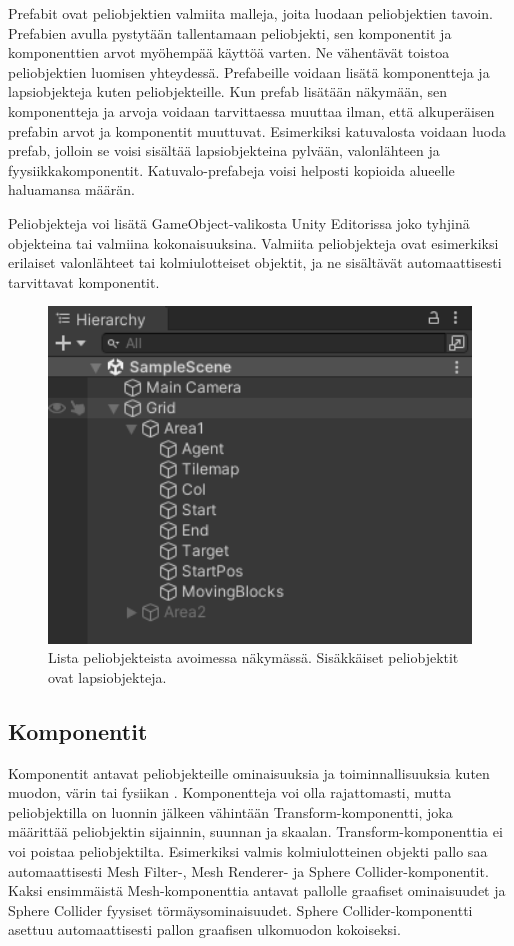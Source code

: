 \documentclass[utf8]{gradu3}
\begin{document}
Prefabit ovat peliobjektien valmiita malleja, joita luodaan peliobjektien tavoin. Prefabien avulla pystytään tallentamaan peliobjekti, sen komponentit ja komponenttien arvot myöhempää käyttöä varten. Ne vähentävät toistoa peliobjektien luomisen yhteydessä. Prefabeille voidaan lisätä komponentteja ja lapsiobjekteja kuten peliobjekteille. Kun prefab lisätään näkymään, sen komponentteja ja arvoja voidaan tarvittaessa muuttaa ilman, että alkuperäisen prefabin arvot ja komponentit muuttuvat. Esimerkiksi katuvalosta voidaan luoda prefab, jolloin se voisi sisältää lapsiobjekteina pylvään, valonlähteen ja fyysiikkakomponentit. Katuvalo-prefabeja voisi helposti kopioida alueelle haluamansa määrän.

Peliobjekteja voi lisätä GameObject-valikosta Unity Editorissa joko tyhjinä objekteina tai valmiina kokonaisuuksina. Valmiita peliobjekteja ovat esimerkiksi erilaiset valonlähteet tai kolmiulotteiset objektit, ja ne sisältävät automaattisesti tarvittavat komponentit.

\begin{figure}[h]
\centering
\includegraphics[width=12cm]{peliobjektilistaus.png}
\caption{Lista peliobjekteista avoimessa näkymässä. Sisäkkäiset peliobjektit ovat lapsiobjekteja.}
\label{peliobjektikuva}
\end{figure}

\subsection{Komponentit}

Komponentit antavat peliobjekteille ominaisuuksia ja toiminnallisuuksia kuten muodon, värin tai fysiikan \parencite{unitydoccomp}. Komponentteja voi olla rajattomasti, mutta peliobjektilla on luonnin jälkeen vähintään Transform-komponentti, joka määrittää peliobjektin sijainnin, suunnan ja skaalan. Transform-komponenttia ei voi poistaa peliobjektilta. Esimerkiksi valmis kolmiulotteinen objekti pallo saa automaattisesti Mesh Filter-, Mesh Renderer- ja Sphere Collider-komponentit. Kaksi ensimmäistä Mesh-komponenttia antavat pallolle graafiset ominaisuudet ja Sphere Collider fyysiset törmäysominaisuudet. Sphere Collider-komponentti asettuu automaattisesti pallon graafisen ulkomuodon kokoiseksi.
\end{document}
